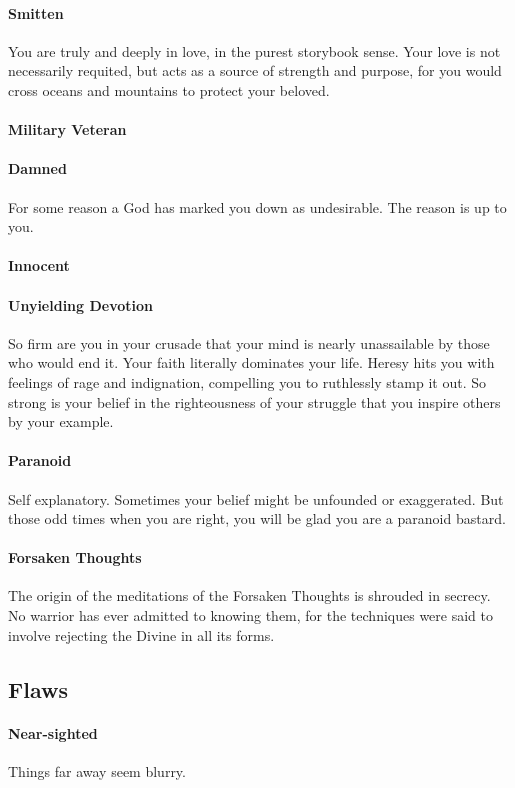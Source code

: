     \paragraph{Smitten} You are truly and deeply in love, in the purest storybook sense. Your love is not necessarily requited, but acts as a source of strength and purpose, for you would cross oceans and mountains to protect your beloved. 
    \paragraph{Military Veteran}
    \paragraph{Damned} For some reason a God has marked you down as undesirable. The reason is up to you. 
    \paragraph{Innocent}
    \paragraph{Unyielding Devotion} So firm are you in your crusade that your mind is nearly unassailable by those who would end it. Your faith literally dominates your life. Heresy hits you with feelings of rage and indignation, compelling you to ruthlessly stamp it out. So strong is your belief in the righteousness of your struggle that you inspire others by your example. 
    \paragraph{Paranoid} Self explanatory. Sometimes your belief might be unfounded or exaggerated. But those odd times when you are right, you will be glad you are a paranoid bastard.
    \paragraph{Forsaken Thoughts} The origin of the meditations of the Forsaken Thoughts is shrouded in secrecy. No warrior has ever admitted to knowing them, for the techniques were said to involve rejecting the Divine in all its forms.
\subsection{Flaws}
    \paragraph{Near-sighted} Things far away seem blurry.
